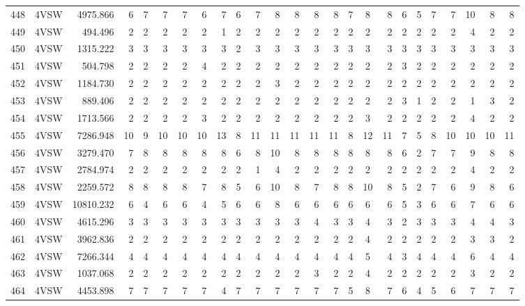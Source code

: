 \documentclass[12pt]{article}\usepackage[]{graphicx}\usepackage[]{color}
\begin{document}
\begin{landscape}
\begin{longtable}[t]{crrrrrrrrrrrrrrrcrrrrrrrr}
448 & 4VSW & 4975.866 & 6 & 7 & 7 & 7 & 6 & 7 & 6 & 7 & 8 & 8 & 8 & 8 & 7 & 8 & 8 & 6 & 5 & 7 & 7 & 10 & 8 & 8\\
449 & 4VSW & 494.496 & 2 & 2 & 2 & 2 & 2 & 1 & 2 & 2 & 2 & 2 & 2 & 2 & 2 & 2 & 2 & 2 & 2 & 2 & 2 & 4 & 2 & 2\\
450 & 4VSW & 1315.222 & 3 & 3 & 3 & 3 & 3 & 3 & 2 & 3 & 3 & 3 & 3 & 3 & 3 & 3 & 3 & 3 & 3 & 3 & 3 & 3 & 3 & 3\\
451 & 4VSW & 504.798 & 2 & 2 & 2 & 2 & 4 & 2 & 2 & 2 & 2 & 2 & 2 & 2 & 2 & 2 & 2 & 3 & 2 & 2 & 2 & 2 & 2 & 2\\
452 & 4VSW & 1184.730 & 2 & 2 & 2 & 2 & 2 & 2 & 2 & 2 & 3 & 2 & 2 & 2 & 2 & 2 & 2 & 2 & 2 & 2 & 2 & 2 & 2 & 2\\
453 & 4VSW & 889.406 & 2 & 2 & 2 & 2 & 2 & 2 & 2 & 2 & 2 & 2 & 2 & 2 & 2 & 2 & 2 & 3 & 1 & 2 & 2 & 1 & 3 & 2\\
454 & 4VSW & 1713.566 & 2 & 2 & 2 & 2 & 3 & 2 & 2 & 2 & 2 & 2 & 2 & 2 & 2 & 3 & 2 & 2 & 2 & 2 & 2 & 4 & 2 & 2\\
455 & 4VSW & 7286.948 & 10 & 9 & 10 & 10 & 10 & 13 & 8 & 11 & 11 & 11 & 11 & 11 & 8 & 12 & 11 & 7 & 5 & 8 & 10 & 10 & 10 & 11\\
456 & 4VSW & 3279.470 & 7 & 8 & 8 & 8 & 8 & 8 & 6 & 8 & 10 & 8 & 8 & 8 & 8 & 8 & 8 & 6 & 2 & 7 & 7 & 9 & 8 & 8\\
457 & 4VSW & 2784.974 & 2 & 2 & 2 & 2 & 2 & 2 & 2 & 1 & 4 & 2 & 2 & 2 & 2 & 2 & 2 & 2 & 2 & 2 & 2 & 4 & 2 & 2\\
458 & 4VSW & 2259.572 & 8 & 8 & 8 & 8 & 7 & 8 & 5 & 6 & 10 & 8 & 7 & 8 & 8 & 10 & 8 & 5 & 2 & 7 & 6 & 9 & 8 & 6\\
459 & 4VSW & 10810.232 & 6 & 4 & 6 & 6 & 4 & 5 & 6 & 6 & 8 & 6 & 6 & 6 & 6 & 6 & 6 & 5 & 3 & 6 & 6 & 7 & 6 & 6\\
460 & 4VSW & 4615.296 & 3 & 3 & 3 & 3 & 3 & 3 & 3 & 3 & 3 & 3 & 4 & 3 & 3 & 4 & 3 & 2 & 3 & 3 & 3 & 4 & 4 & 3\\
461 & 4VSW & 3962.836 & 2 & 2 & 2 & 2 & 2 & 2 & 2 & 2 & 2 & 2 & 2 & 2 & 2 & 4 & 2 & 2 & 2 & 2 & 2 & 3 & 3 & 2\\
462 & 4VSW & 7266.344 & 4 & 4 & 4 & 4 & 4 & 4 & 4 & 4 & 4 & 4 & 4 & 4 & 4 & 5 & 4 & 3 & 4 & 4 & 4 & 6 & 4 & 4\\
463 & 4VSW & 1037.068 & 2 & 2 & 2 & 2 & 2 & 2 & 2 & 2 & 2 & 2 & 3 & 2 & 2 & 4 & 2 & 2 & 2 & 2 & 2 & 3 & 2 & 2\\
464 & 4VSW & 4453.898 & 7 & 7 & 7 & 7 & 7 & 4 & 7 & 7 & 7 & 7 & 7 & 7 & 5 & 8 & 7 & 6 & 4 & 5 & 6 & 7 & 7 & 7\\

\end{longtable}
\end{landscape}
\end{document}
